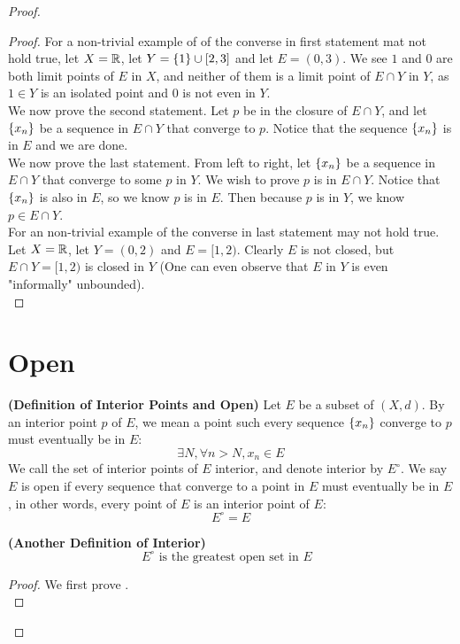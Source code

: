 \documentclass{report}
\begin{document}
\begin{proof}
\begin{proof}
For a non-trivial example of of the converse in first statement mat not hold true, let $X=\mathbb{R}$, let $Y=\{ 1 \}\cup [2,3]$ and let $E=(0,3)$. We see $1$ and $0$ are both limit points of $E$ in $X$, and neither of them is a limit point of  $E\cap Y$ in $Y$, as $1\in Y$ is an isolated point and $0$ is not even in $Y$.\\

We now prove the second statement. Let $p$ be in the closure of $E\cap Y$, and let $\{ x_n \}$ be a sequence in $E\cap Y$ that converge to $p$. Notice that the sequence $\{ x_n \}$ is in $E$ and we are done.\\

We now prove the last statement. From left to right, let $\{ x_n \}$ be a sequence in $E\cap Y$ that converge to some $p$ in $Y$. We wish to prove  $p$ is in  $E\cap Y$. Notice that $\{ x_n \}$ is also in $E$, so we know  $p$ is in $E$. Then because $p$ is in $Y$, we know  $p\in  E\cap Y$.\\

For an non-trivial example of the converse in last statement may not hold true. Let $X=\mathbb{R}$, let $Y=(0,2)$ and $E=[1,2)$. Clearly $E$ is not closed, but  $E\cap Y=[1,2)$ is closed in $Y$ (One can even observe that $E$ in  $Y$ is even "informally" unbounded).\\
\end{proof}
\section{Open}
\begin{definition}
\label{1.3.1}
\textbf{(Definition of Interior Points and Open)} Let $E$ be a subset of $(X,d)$. By an interior point $p$ of $E$, we mean a point such every sequence  $\{ x_n \}$ converge to $p$ must eventually be in  $E$:
 \begin{equation}
\exists N, \forall n>N, x_n\in E
\end{equation}
We call the set of interior points of $E$  interior, and denote interior by  $E^\circ $. We say $E$ is open if every sequence that converge to a point in  $E$ must eventually be in  $E$, in other words, every point of $E$ is an interior point of $E$:
 \begin{equation}
E^\circ =E
\end{equation}
\end{definition}
\begin{theorem}
\label{1.3.2}
\textbf{(Another Definition of Interior)} 
\begin{equation}
E^\circ\text{ is the greatest open set in $E$ }
\end{equation}
\end{theorem}
\begin{proof}
We first prove .\\


\end{proof}
\end{proof}
\end{document}
